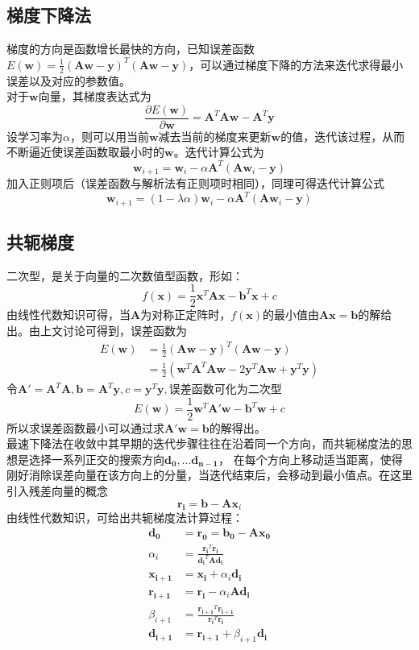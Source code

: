 \documentclass[a4paper,11pt,UTF8]{ctexart}
\begin{document}
\subsection{梯度下降法}
梯度的方向是函数增长最快的方向，已知误差函数$E(\bm{w}) = \frac{1}{2}(\bm{Aw} - \bm{y}) ^{T}(\bm{Aw} - \bm{y})$，可以通过梯度下降的方法来迭代求得最小误差以及对应的参数值。\\
对于$\bm{w}$向量，其梯度表达式为$$ \frac{\partial E(\bm{w})}{\partial \bm{w}} = \bm{A}^{T}\bm{Aw} - \bm{A}^{T}\bm{y} $$
设学习率为$\alpha$，则可以用当前$\bm{w}$减去当前的梯度来更新$\bm{w}$的值，迭代该过程，从而不断逼近使误差函数取最小时的$\bm{w}$。迭代计算公式为$$ \bm{w}_{i+1} = \bm{w}_{i} - \alpha \bm{A}^{T}(\bm{A}\bm{w}_{i} - \bm{y}) $$
加入正则项后（误差函数与解析法有正则项时相同），同理可得迭代计算公式
$$\bm{w}_{i+1} = (1 - \lambda \alpha)\bm{w}_{i} - \alpha \bm{A}^{T}(\bm{A}\bm{w}_{i} - \bm{y}) $$

\subsection{共轭梯度}
二次型，是关于向量的二次数值型函数，形如： $$ f(\bm{x}) = \frac{1}{2} \bm{x}^{T}\bm{Ax} - \bm{b}^{T}\bm{x} + c$$
由线性代数知识可得，当$\bm{A}$为对称正定阵时，$f(\bm{x})$的最小值由$\bm{Ax} = \bm{b}$的解给出。由上文讨论可得到，误差函数为
\begin{equation}	
	\begin{aligned}
		E(\bm{w}) &= \frac{1}{2}(\bm{Aw} - \bm{y}) ^{T}(\bm{Aw} - \bm{y}) \\
 		&= \frac{1}{2}(\bm{w}^{T}\bm{A}^{T}\bm{Aw} - 2\bm{y}^{T}\bm{Aw} + \bm{y}^{T}\bm{y}) \nonumber
	\end{aligned}
\end{equation}
令$\bm{A'} = \bm{A}^{T}\bm{A}, \bm{b} = \bm{A}^{T}\bm{y}, c = \bm{y}^{T}\bm{y},$误差函数可化为二次型
$$ E(\bm{w}) = \frac{1}{2}\bm{w}^{T}\bm{A'}\bm{w} - \bm{b}^{T}\bm{w} + c$$
所以求误差函数最小可以通过求$\bm{A'w} = \bm{b}$的解得出。 \\
\indent 最速下降法在收敛中其早期的迭代步骤往往在沿着同一个方向，而共轭梯度法的思想是选择一系列正交的搜索方向$\bm{d_{0}}, ... \bm{d_{n-1}}$，
在每个方向上移动适当距离，使得刚好消除误差向量在该方向上的分量，当迭代结束后，会移动到最小值点。在这里引入残差向量的概念
$$ \bm{r_{i}} = \bm{b} - \bm{A}\bm{x}_{i}$$
由线性代数知识，可给出共轭梯度法计算过程：
\begin{equation}
\nonumber
\begin{split} 
\bm{d_{0}} &= \bm{r_{0}} = \bm{b_{0}} - \textbf{A} \bm{x_{0}} \\ 
\alpha_{i} &= \frac{\bm{r_{i}}^T \bm{r_{i}}} {\bm{d_{i}}^T \textbf{A} \bm{d_{i}}} \qquad  \\
\bm{x_{i+1}} &= \bm{x_{i}} + \alpha_{i} \bm{d_{i}} \\ 
\bm{r_{i+1}} &= \bm{r_{i}} - \alpha_{i} \textbf{A} \bm{d_{i}} \\ 
\beta_{i+1} &= \frac{\bm{r_{i+1}}^T \bm{r_{i+1}}} {\bm{r_{i}}^T \bm{r_{i}}} \\ 
\bm{d_{i+1}} &= \bm{r_{i+1}} + \beta_{i+1} \bm{d_{i}} 
\end{split}
\end{equation}
\end{document}
